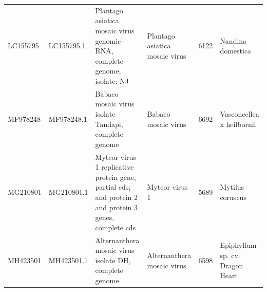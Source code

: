 \documentclass[11pt]{article}
\begin{document}
\begin{supptable}[ht]
{\begin{tabular}{llllll}
LC155795 & LC155795.1 & Plantago asiatica mosaic virus genomic RNA, complete genome, isolate: NJ                                                                                                                                                                                         & Plantago asiatica mosaic virus & 6122            & Nandina domestica                     \\
MF978248 & MF978248.1 & Babaco mosaic virus isolate Tandapi, complete genome                                                                                                                                                                                                             & Babaco mosaic virus            & 6692            & Vasconcellea x heilbornii             \\
MG210801 & MG210801.1 & Mytcor virus 1 replicative protein gene, partial cds; and protein 2 and protein 3 genes, complete cds                                                                                                                                                            & Mytcor virus 1                 & 5689            & Mytilus coruscus                      \\
MH423501 & MH423501.1 & Alternanthera mosaic virus isolate DH, complete genome                                                                                                                                                                                                           & Alternanthera mosaic virus     & 6598            & Epiphyllum sp. cv. Dragon Heart      
\end{tabular}%
}
\end{supptable}
\restoregeometry
\clearpage
\end{document}
